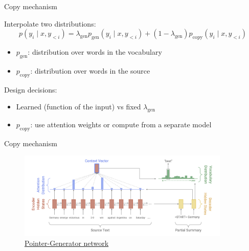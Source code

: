 \documentclass[usenames,dvipsnames,notes,11pt,aspectratio=169,hyperref={colorlinks=true, linkcolor=blue}]{beamer}
\begin{document}
\begin{frame}
    {Copy mechanism}

    Interpolate two distributions:
    $$
    p(y_i\mid x, y_{<i}) = \lambda_{\text{gen}}p_{\text{gen}}(y_i\mid x, y_{<i})
    + (1 - \lambda_{\text{gen}})p_{\text{copy}}(y_i\mid x, y_{<i})
    $$
    \vspace{-2em}
    \begin{itemize}
        \item $p_{\text{gen}}$: distribution over words in the vocabulary
        \item $p_{\text{copy}}$: distribution over words in the source
    \end{itemize}

    Design decisions:\\
    \begin{itemize}
        \item Learned (function of the input) vs fixed $\lambda_{\text{gen}}$
        \item $p_{\text{copy}}$: use attention weights or compute from a separate model
    \end{itemize}
\end{frame}

\begin{frame}
    {Copy mechanism}
            \begin{figure}
                \includegraphics[width=0.9\textwidth]{figures/copy}
                \caption{\href{https://arxiv.org/pdf/1704.04368}{Pointer-Generator network}}
            \end{figure}
\end{frame}
\end{document}
